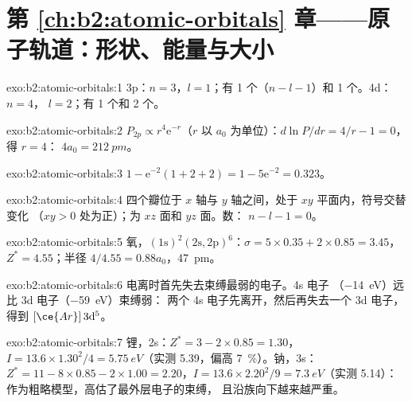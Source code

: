 \section*{第 \ref{ch:b2:atomic-orbitals} 章——原子轨道：形状、能量与大小}

\begin{solution}{exo:b2:atomic-orbitals:1}
3p：$n = 3$，$l = 1$；有 1 个（$n - l - 1$）和 1 个。4d：$n = 4$，
$l = 2$；有 1 个和 2 个。
\end{solution}

\begin{solution}{exo:b2:atomic-orbitals:2}
$P_{2p} \propto r^4\mathrm e^{-r}$（$r$ 以 $a_0$ 为单位）：$d\ln P/dr = 4/r - 1 = 0$，得 $r = 4$：
$4a_0 = \qty{212}{pm}$。
\end{solution}

\begin{solution}{exo:b2:atomic-orbitals:3}
$1 - \mathrm e^{-2}(1 + 2 + 2) = 1 - 5\mathrm e^{-2} = 0.323$。
\end{solution}

\begin{solution}{exo:b2:atomic-orbitals:4}
四个瓣位于 $x$ 轴与 $y$ 轴之间，处于 $xy$ 平面内，符号交替变化
（$xy > 0$ 处为正）；为 $xz$ 面和 $yz$ 面。数：
$n - l - 1 = 0$。
\end{solution}

\begin{solution}{exo:b2:atomic-orbitals:5}
氧，$(1\mathrm s)^2(2\mathrm s, 2\mathrm p)^6$：$\sigma = 5 \times 0.35 + 2 \times 0.85
= 3.45$，$Z^* = 4.55$；半径 $4/4.55 = 0.88a_0$，\qty{47}{pm}。
\end{solution}

\begin{solution}{exo:b2:atomic-orbitals:6}
电离时首先失去束缚最弱的电子。4s 电子
（\qty{-14}{eV}）远比 3d 电子（\qty{-59}{eV}）束缚弱：
两个 4s 电子先离开，然后再失去一个 3d 电子，得到 $[\ce{Ar}]\,3\mathrm d^5$。
\end{solution}

\begin{solution}{exo:b2:atomic-orbitals:7}
锂，2s：$Z^* = 3 - 2 \times 0.85 = 1.30$，$I = 13.6 \times 1.30^2/4 =
\qty{5.75}{eV}$（实测 5.39，偏高 7~\%）。钠，3s：$Z^* = 11 - 8 \times 0.85 -
2 \times 1.00 = 2.20$，$I = 13.6 \times 2.20^2/9 = \qty{7.3}{eV}$（实测 5.14）：
作为粗略模型，高估了最外层电子的束缚，
且沿族向下越来越严重。
\end{solution}

